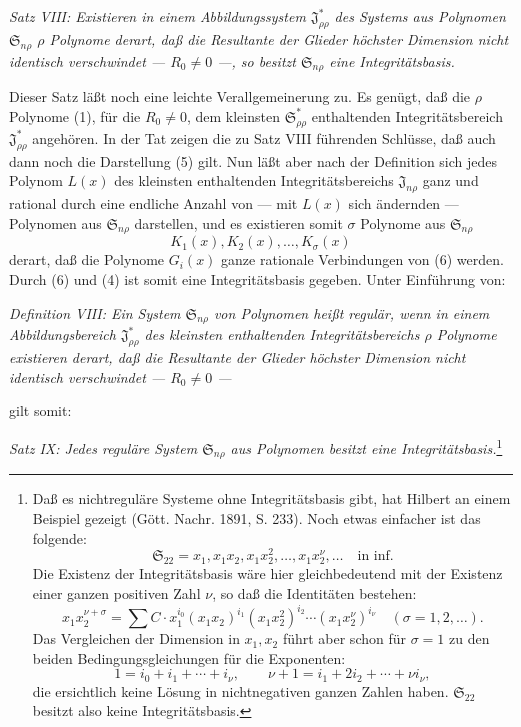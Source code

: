 \documentclass[11pt]{article}
\providecommand{\Ssys}{\mathfrak{S}}
\providecommand{\Jdom}{\mathfrak{J}}
\begin{document}
\emph{Satz VIII: Existieren in einem Abbildungssystem $\Jdom^*_{\rho\rho}$ des Systems aus Polynomen $\Ssys_{n\rho}$ $\rho$ Polynome derart, daß die Resultante der Glieder höchster Dimension nicht identisch verschwindet --- $R_0\ne0$ ---, so besitzt $\Ssys_{n\rho}$ eine Integritätsbasis.}

Dieser Satz läßt noch eine leichte Verallgemeinerung zu. Es genügt, daß die $\rho$ Polynome (1), für die $R_0\ne0$, dem kleinsten $\Ssys^*_{\rho\rho}$ enthaltenden Integritätsbereich $\Jdom^*_{\rho\rho}$ angehören. In der Tat zeigen die zu Satz VIII führenden Schlüsse, daß auch dann noch die Darstellung (5) gilt. Nun läßt aber nach der Definition sich jedes Polynom $L(x)$ des kleinsten enthaltenden Integritätsbereichs $\Jdom_{n\rho}$ ganz und rational durch eine endliche Anzahl von --- mit $L(x)$ sich ändernden --- Polynomen aus $\Ssys_{n\rho}$ darstellen, und es existieren somit $\sigma$ Polynome aus $\Ssys_{n\rho}$
\begin{equation}
  K_1(x),K_2(x),\ldots,K_\sigma(x)
\tag{6}
\end{equation}
derart, daß die Polynome $G_i(x)$ ganze rationale Verbindungen von (6) werden. Durch (6) und (4) ist somit eine Integritätsbasis gegeben. Unter Einführung von:

\emph{Definition VIII: Ein System $\Ssys_{n\rho}$ von Polynomen heißt regulär, wenn in einem Abbildungsbereich $\Jdom^*_{\rho\rho}$ des kleinsten enthaltenden Integritätsbereichs $\rho$ Polynome existieren derart, daß die Resultante der Glieder höchster Dimension nicht identisch verschwindet --- $R_0\ne0$ ---}

gilt somit:

\emph{Satz IX: Jedes reguläre System $\Ssys_{n\rho}$ aus Polynomen besitzt eine Integritätsbasis.}\footnote{Daß es nichtreguläre Systeme ohne Integritätsbasis gibt, hat Hilbert an einem Beispiel gezeigt (Gött. Nachr. 1891, S. 233). Noch etwas einfacher ist das folgende:
\[
  \Ssys_{22}=x_1,
  x_1x_2,
  x_1x_2^2,
  \ldots,
  x_1x_2^\nu,
  \ldots\quad\text{in inf.}
\]
Die Existenz der Integritätsbasis wäre hier gleichbedeutend mit der Existenz einer ganzen positiven Zahl $\nu$, so daß die Identitäten bestehen:
\[
  x_1x_2^{\nu+\sigma}=\sum C\cdot x_1^{i_0}(x_1x_2)^{i_1}(x_1x_2^2)^{i_2}\cdots(x_1x_2^\nu)^{i_\nu}
  \quad(\sigma=1,2,\ldots).
\]
Das Vergleichen der Dimension in $x_1,x_2$ führt aber schon für $\sigma=1$ zu den beiden Bedingungsgleichungen für die Exponenten:
\[
  1=i_0+i_1+\cdots+i_\nu,
  \qquad
  \nu+1=i_1+2i_2+\cdots+\nu i_\nu,
\]
die ersichtlich keine Lösung in nichtnegativen ganzen Zahlen haben. $\Ssys_{22}$ besitzt also keine Integritätsbasis.}
\end{document}
